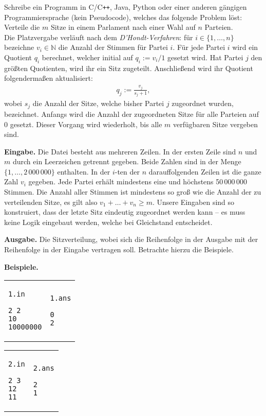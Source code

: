 \documentclass{uebung_cs}
\begin{document}
Schreibe ein Programm in C/C\texttt{++}, Java, Python oder einer anderen gängigen Programmiersprache (kein Pseudocode), welches das folgende Problem löst: 
Verteile die $m$ Sitze in einem Parlament nach einer Wahl auf $n$ Parteien.\\[0.25cm]
Die Platzvergabe verläuft nach dem \emph{D'Hondt-Verfahren}:
für $i \in \{1, \dots, n\}$ bezeichne $v_i \in \mathbb N$ die Anzahl der Stimmen für Partei $i$.
Für jede Partei $i$ wird ein Quotient $q_i$ berechnet, welcher initial auf $q_i := v_i/1$ gesetzt wird.
Hat Partei $j$ den größten Quotienten, wird ihr ein Sitz zugeteilt.
Anschließend wird ihr Quotient folgendermaßen aktualisiert:
\begin{align*}
    q_j := \frac{v_j}{s_j + 1},
\end{align*}
wobei $s_j$ die Anzahl der Sitze, welche bisher Partei $j$ zugeordnet wurden, bezeichnet.
Anfangs wird die Anzahl der zugeordneten Sitze für alle Parteien auf $0$ gesetzt.
Dieser Vorgang wird wiederholt, bis alle $m$ verfügbaren Sitze vergeben sind.

\textbf{Eingabe.}
Die Datei besteht aus mehreren Zeilen.
In der ersten Zeile sind $n$ und $m$ durch ein Leerzeichen getrennt gegeben.
Beide Zahlen sind in der Menge $\{1, \dots, 2\,000\,000\}$ enthalten.
In der $i$-ten der $n$ darauffolgenden Zeilen ist die ganze Zahl $v_i$ gegeben.
Jede Partei erhält mindestens eine und höchstens 50\,000\,000 Stimmen.
Die Anzahl aller Stimmen ist mindestens so groß wie die Anzahl der zu verteilenden Sitze, es gilt also $v_1 + \dots + v_n \geq m$.
Unsere Eingaben sind so konstruiert, dass der letzte Sitz eindeutig zugeordnet werden kann -- es muss keine Logik eingebaut werden, welche bei Gleichstand entscheidet.

\textbf{Ausgabe.}
Die Sitzverteilung, wobei sich die Reihenfolge in der Ausgabe mit der Reihenfolge in der Eingabe vertragen soll. Betrachte hierzu die Beispiele.

\textbf{Beispiele.}\\
\begin{tabular}{p{}p{}}
\texttt{1.in}
\begin{verbatim}
2 2
10
10000000
\end{verbatim}
&
\texttt{1.ans}
\begin{verbatim}
0
2
\end{verbatim}
\end{tabular}

\begin{tabular}{p{}p{}}
\texttt{2.in}
\begin{verbatim}
2 3
12
11
\end{verbatim}
&
\texttt{2.ans}
\begin{verbatim}
2
1
\end{verbatim}
\end{tabular}
\end{document}
